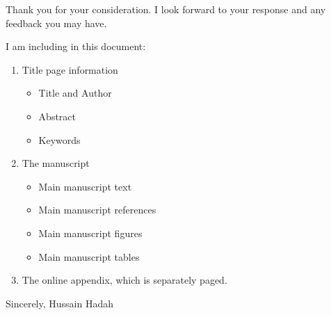 \documentclass[12pt,english]{article}
\begin{document}
\bigskip
\noindent Thank you for your consideration. I look forward to your response and any feedback you may have.

I am including in this document:
\begin{enumerate}
    \item Title page information
    \begin{itemize}
        \item Title and Author
        \item Abstract
        \item Keywords
    \end{itemize}
    \item The manuscript
    \begin{itemize}
        \item Main manuscript text
        \item Main manuscript references
        \item Main manuscript figures
        \item Main manuscript tables
    \end{itemize}    
    \item The online appendix, which is separately paged.
\end{enumerate}


\bigskip
\noindent Sincerely,
\noindent Hussain Hadah




\end{document}
